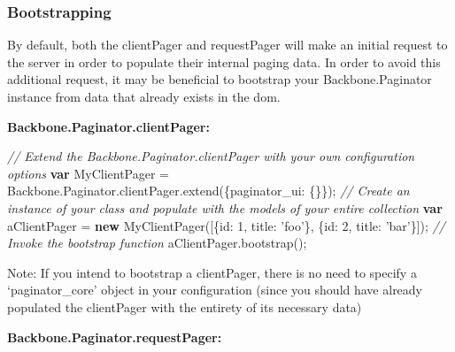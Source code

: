 \documentclass[9pt]{book}
\newenvironment{Shaded}{}{}
\newcommand{\KeywordTok}[1]{\textcolor[rgb]{0.00,0.44,0.13}{\textbf{{#1}}}}
\newcommand{\DataTypeTok}[1]{\textcolor[rgb]{0.56,0.13,0.00}{{#1}}}
\newcommand{\DecValTok}[1]{\textcolor[rgb]{0.25,0.63,0.44}{{#1}}}
\newcommand{\StringTok}[1]{\textcolor[rgb]{0.25,0.44,0.63}{{#1}}}
\newcommand{\CommentTok}[1]{\textcolor[rgb]{0.38,0.63,0.69}{\textit{{#1}}}}
\newcommand{\OtherTok}[1]{\textcolor[rgb]{0.00,0.44,0.13}{{#1}}}
\newcommand{\FunctionTok}[1]{\textcolor[rgb]{0.02,0.16,0.49}{{#1}}}
\newcommand{\NormalTok}[1]{{#1}}
\begin{document}
\subsubsection{Bootstrapping}\label{bootstrapping}

By default, both the clientPager and requestPager will make an initial
request to the server in order to populate their internal paging data.
In order to avoid this additional request, it may be beneficial to
bootstrap your Backbone.Paginator instance from data that already exists
in the dom.

\textbf{Backbone.Paginator.clientPager:}

\begin{Shaded}
\begin{Highlighting}[]

\CommentTok{// Extend the Backbone.Paginator.clientPager with your own configuration options}
\KeywordTok{var} \NormalTok{MyClientPager =  }\OtherTok{Backbone}\NormalTok{.}\OtherTok{Paginator}\NormalTok{.}\OtherTok{clientPager}\NormalTok{.}\FunctionTok{extend}\NormalTok{(\{}\DataTypeTok{paginator_ui}\NormalTok{: \{\}\});}
\CommentTok{// Create an instance of your class and populate with the models of your entire collection}
\KeywordTok{var} \NormalTok{aClientPager = }\KeywordTok{new} \FunctionTok{MyClientPager}\NormalTok{([\{}\DataTypeTok{id}\NormalTok{: }\DecValTok{1}\NormalTok{, }\DataTypeTok{title}\NormalTok{: }\StringTok{'foo'}\NormalTok{\}, \{}\DataTypeTok{id}\NormalTok{: }\DecValTok{2}\NormalTok{, }\DataTypeTok{title}\NormalTok{: }\StringTok{'bar'}\NormalTok{\}]);}
\CommentTok{// Invoke the bootstrap function}
\OtherTok{aClientPager}\NormalTok{.}\FunctionTok{bootstrap}\NormalTok{();}
\end{Highlighting}
\end{Shaded}

Note: If you intend to bootstrap a clientPager, there is no need to
specify a `paginator\_core' object in your configuration (since you
should have already populated the clientPager with the entirety of its
necessary data)

\textbf{Backbone.Paginator.requestPager:}
\end{document}
